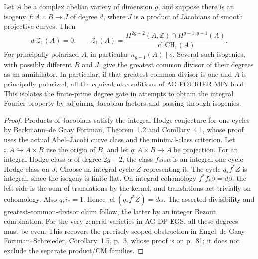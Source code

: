 \begin{proposition}
Let $A$ be a complex abelian variety of dimension $g$,
and suppose there is an isogeny
$f:A\times B\to J$ of degree $d$, where $J$ is a product
of Jacobians of smooth projective curves.  Then
\[
 d\,\mathcal Z_1(A)=0,\qquad
 \mathcal Z_1(A)=\frac{H^{2g-2}(A,\mathbb Z)\cap H^{g-1,g-1}(A)}
                         {\operatorname{cl}\mathrm{CH}_1(A)}.
\]
For principally polarized $A$, in particular
$\kappa_{g-1}(A)\mid d$.  Several such isogenies, with
possibly different $B$ and $J$, give the greatest common
divisor of their degrees as an annihilator.  In particular,
if that greatest common divisor is one and $A$ is principally
polarized, all the equivalent conditions of AG-FOURIER-MIN
hold.  This isolates the finite-prime degree gate in attempts to obtain the
integral Fourier property by adjoining Jacobian factors
and passing through isogenies.
\end{proposition}
\begin{proof}
Products of Jacobians satisfy the integral Hodge conjecture
for one-cycles by Beckmann--de Gaay Fortman, Theorem~1.2
and Corollary~4.1, whose proof uses the actual Abel--Jacobi
curve class and the minimal-class criterion.
Let $i:A\hookrightarrow A\times B$ use the origin of $B$,
and let $q:A\times B\to A$ be projection.  For an integral
Hodge class $\alpha$ of degree $2g-2$, the class
$f_*i_*\alpha$ is an integral one-cycle Hodge class on $J$.
Choose an integral cycle $Z$ representing it.
The cycle $q_*f^*Z$ is integral, since the isogeny is finite
flat.  On integral cohomology
$f^*f_*\beta=d\beta$: the left side is the sum of
translations by the kernel, and translations act trivially
on cohomology.  Also $q_*i_*=1$.  Hence
$\operatorname{cl}(q_*f^*Z)=d\alpha$.
The asserted divisibility and greatest-common-divisor
claim follow, the latter by an integer Bezout combination.
For the very general varieties in AG-DP-EGS, all these
degrees must be even.  This recovers the precisely scoped
obstruction in Engel--de Gaay Fortman--Schreieder,
Corollary~1.5, p.~3, whose proof is on p.~81; it does not
exclude the separate product/CM families.
\end{proof}

